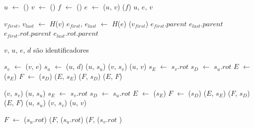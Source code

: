 \LCOSplice{}


\begin{algorithm}[htb]
\caption{\LCOMakeEdge()}
\label{Algo:LCOMakeEdge}
\begin{algorithmic}[1]
\State $u$ $\gets$ \LCOMakeNode()
\State $v$ $\gets$ \LCOMakeNode()
\State $f$ $\gets$ \LCOMakeNode()
\State $e$ $\gets$ \LCOLink($u$, $v$)
\State \LCOLoop($f$)
\State \Return $u$, $e$, $v$ 
\end{algorithmic}
\end{algorithm}

\begin{algorithm}[htb]
\caption{\LCOFindSubNode($v$, $e$)}
\label{Algo:LCOFindSubNode}
\begin{algorithmic}[1]
\State $v_{first}$, $v_{last}$ $\gets$ $H$($v$)
\State $e_{first}$, $e_{last}$ $\gets$ $H$($e$)
\State \linkcutEvert($v_{first}$)
\State \Return $e_{first}$.$parent$
\EndIf
\State \Return $e_{last}$.$parent$
\Else
{}
\State \Return $e_{first}.rot.parent$
\Else
\State \Return $e_{last}.rot.parent$
\EndIf
\EndIf
\end{algorithmic}
\end{algorithm}

$v$, $u$, $e$, $d$ são identificadores
\begin{algorithm}[htb]
\caption{\LCOSplice($v$, $e$, $u$, $d$)}
\label{Algo:LCOSplice}
\begin{algorithmic}[1]
\State $s_v$ $\gets$ \LCOFindSubNode($v$, $e$)
\State $s_u$ $\gets$ \LCOFindSubNode($u$, $d$)
\State \LCOCycle($u$, $s_u$)
\State \LCOCycle($v$, $s_v$)
\State \LCOMerge($u$, $v$)
\State $s_E$ $\gets$ $s_v$.$rot$
\State $s_D$ $\gets$ $s_u$.$rot$
\State $E$ $\gets$ \LCOFindNode($s_E$)
\State $F$ $\gets$ \LCOFindNode($s_D$)
\State \LCOCycle($E$, $s_E$)
\State \LCOCycle($F$, $s_D$)
\State \LCOMerge($E$, $F$)
\State \Return
\EndIf

\State \LCOCycle($v$, $s_v$)
\State \LCOSplit($u$, $s_u$)
\State $s_E$ $\gets$ $s_v$.$rot$
\State $s_D$ $\gets$ $s_u$.$rot$
\State $E$ $\gets$ \LCOFindNode($s_E$)
\State $F$ $\gets$ \LCOFindNode($s_D$)
\State \LCOCycle($E$, $s_E$)
\State \LCOCycle($F$, $s_D$)
\State \LCOMerge($E$, $F$)
\Else
{}
\State \Return
\EndIf
\State \LCOCycle($u$, $s_u$)
\State \LCOCycle($v$, $s_v$)
\State \LCOMerge($u$, $v$)

\State $F$ $\gets$ \LCOFindNode($s_u$.$rot$)
\State \LCOCycle($F$, \LCOFindNode($s_u$.$rot$)
\State \LCOSplit($F$, \LCOFindNode($s_v$.$rot$  )
\EndIf
\end{algorithmic}
\end{algorithm}

